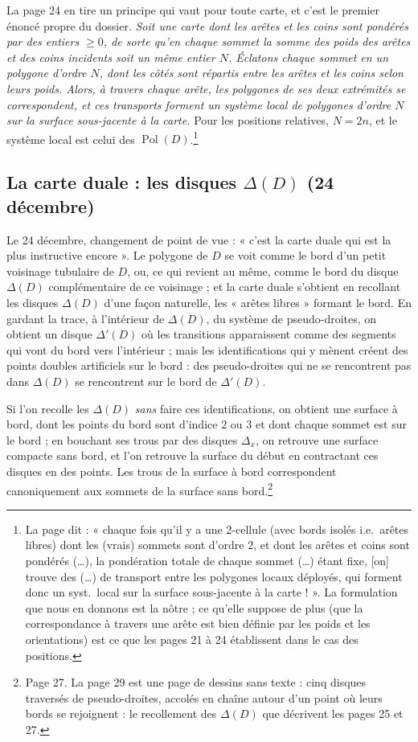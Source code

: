 \documentclass[11pt,a4paper]{article}
\begin{document}
La page 24 en tire un principe qui vaut pour toute carte, et c'est le premier
énoncé propre du dossier. \emph{Soit une carte dont les arêtes et les coins
sont pondérés par des entiers $\geqslant 0$, de sorte qu'en chaque sommet la
somme des poids des arêtes et des coins incidents soit un même entier $N$.
Éclatons chaque sommet en un polygone d'ordre $N$, dont les côtés sont répartis
entre les arêtes et les coins selon leurs poids. Alors, à travers chaque arête,
les polygones de ses deux extrémités se correspondent, et ces transports forment
un système local de polygones d'ordre $N$ sur la surface sous-jacente à la
carte.} Pour les positions relatives, $N = 2n$, et le système local est celui
des $\operatorname{Pol}(D)$.\footnote{La page dit : « chaque fois qu'il y a une
2-cellule (avec bords isolés i.e.\ arêtes libres) dont les (vrais) sommets sont
d'ordre $2$, et dont les arêtes et coins sont pondérés (\ldots), la pondération
totale de chaque sommet (\ldots) étant fixe, [on] trouve des (\ldots) de
transport entre les polygones locaux déployés, qui forment donc un syst.\ local
sur la surface sous-jacente à la carte ! ». La formulation que nous en donnons
est la nôtre ; ce qu'elle suppose de plus (que la correspondance à travers une
arête est bien définie par les poids et les orientations) est ce que les pages
21 à 24 établissent dans le cas des positions.}

\subsection*{La carte duale : les disques $\Delta(D)$ (24 décembre)}

Le 24 décembre, changement de point de vue : « c'est la carte duale qui est la plus instructive encore ». Le polygone de $D$ se voit comme le bord d'un
petit voisinage tubulaire de $D$, ou, ce qui revient au même, comme le bord du
disque $\Delta(D)$ complémentaire de ce voisinage ; et la carte duale s'obtient
en recollant les disques $\Delta(D)$ d'une façon naturelle, les « arêtes
libres » formant le bord. En gardant la trace, à l'intérieur de $\Delta(D)$, du
système de pseudo-droites, on obtient un disque $\Delta'(D)$ où les transitions
apparaissent comme des segments qui vont du bord vers l'intérieur ; mais les
identifications qui y mènent créent des points doubles artificiels sur le bord :
des pseudo-droites qui ne se rencontrent pas dans $\Delta(D)$ se rencontrent sur
le bord de $\Delta'(D)$.

Si l'on recolle les $\Delta(D)$ \emph{sans} faire ces identifications, on obtient
une surface à bord, dont les points du bord sont d'indice $2$ ou $3$ et dont
chaque sommet est sur le bord ; en bouchant ses trous par des disques
$\Delta_x$, on retrouve une surface compacte sans bord, et l'on retrouve la
surface du début en contractant ces disques en des points. Les trous de la
surface à bord correspondent canoniquement aux sommets de la surface sans
bord.\footnote{Page 27. La page 29 est une page de dessins sans texte : cinq
disques traversés de pseudo-droites, accolés en chaîne autour d'un point où
leurs bords se rejoignent : le recollement des $\Delta(D)$ que décrivent les
pages 25 et 27.}
\end{document}

